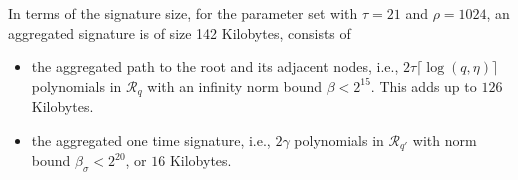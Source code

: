 In terms of the signature size, for the parameter set with $\tau=21$ and $\rho=1024$,
an aggregated signature is of size 142 Kilobytes, consists of 
\begin{itemize}
  \item the aggregated path to the root and its adjacent nodes, i.e., $2\tau\lceil\log(q, \eta)\rceil$ polynomials in $\mathcal{R}_q$ with an infinity norm bound $\beta <2^{15}$. This adds up to $126$ Kilobytes.
  \item the aggregated one time signature, i.e., $2\gamma$ polynomials in $\mathcal{R}_{q'}$ with norm bound $\beta_\sigma < 2^{20}$, or $16$ Kilobytes.
\end{itemize}
